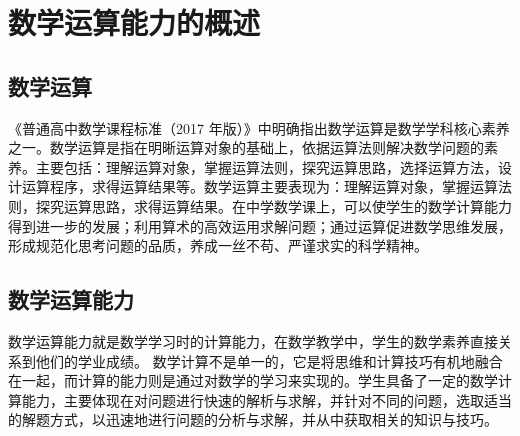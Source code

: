 \chapter{数学运算能力的概述}



\section{数学运算}


《普通高中数学课程标准（2017 年版）》中明确指出数学运算是数学学科核心素养之一\cite{教育部全日制义务教育数学课程标准}。数学运算是指在明晰运算对象的基础上，依据运算法则解决数学问题的素养。主要包括：理解运算对象，掌握运算法则，探究运算思路，选择运算方法，设计运算程序，求得运算结果等。数学运算主要表现为：理解运算对象，掌握运算法则，探究运算思路，求得运算结果\cite{教育部全日制义务教育数学课程标准}。在中学数学课上，可以使学生的数学计算能力得到进一步的发展；利用算术的高效运用求解问题；通过运算促进数学思维发展，形成规范化思考问题的品质，养成一丝不苟、严谨求实的科学精神\cite{教育部全日制义务教育数学课程标准}。

\section{数学运算能力}

数学运算能力就是数学学习时的计算能力，在数学教学中，学生的数学素养直接关系到他们的学业成绩。
数学计算不是单一的，它是将思维和计算技巧有机地融合在一起，而计算的能力则是通过对数学的学习来实现的。学生具备了一定的数学计算能力，主要体现在对问题进行快速的解析与求解，并针对不同的问题，选取适当的解题方式，以迅速地进行问题的分析与求解，并从中获取相关的知识与技巧。





